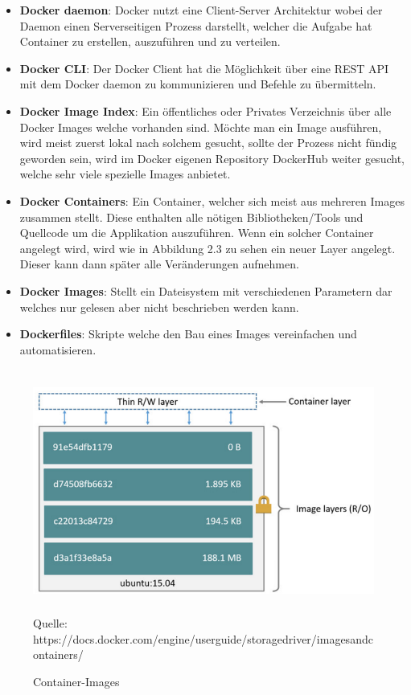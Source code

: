 \documentclass[12pt,toc=bib,toc=listof]{scrreprt}
\begin{document}
\begin{itemize}
	\item \textbf{Docker daemon}: Docker nutzt eine Client-Server Architektur wobei der Daemon einen Serverseitigen Prozess darstellt, welcher die Aufgabe hat Container zu erstellen, auszuführen und zu verteilen.
	
	\item \textbf{Docker CLI}: Der Docker Client hat die Möglichkeit über eine REST API mit dem Docker daemon zu kommunizieren und Befehle zu übermitteln.
	
	\item \textbf{Docker Image Index}: Ein öffentliches oder Privates Verzeichnis über alle Docker Images welche vorhanden sind. Möchte man ein Image ausführen, wird meist zuerst lokal nach solchem gesucht, sollte der Prozess nicht fündig geworden sein, wird im Docker eigenen Repository DockerHub weiter gesucht, welche sehr viele spezielle Images anbietet.\\
	
	\item \textbf{Docker Containers}: Ein Container, welcher sich meist aus mehreren Images zusammen stellt. Diese enthalten alle nötigen Bibliotheken/Tools und Quellcode um die Applikation auszuführen.
	Wenn ein solcher Container angelegt wird, wird wie in Abbildung 2.3 zu sehen ein neuer Layer angelegt. Dieser kann dann später alle Veränderungen aufnehmen.
	
	\item \textbf{Docker Images}: Stellt ein Dateisystem mit verschiedenen Parametern dar welches nur gelesen aber nicht beschrieben werden kann.
	
	\item \textbf{Dockerfiles}: Skripte welche den Bau eines Images vereinfachen und automatisieren.
\end{itemize}

\begin{figure}
	\centering
	\caption{Container-Images}
	\includegraphics[width=15cm, height=8cm, scale=0.3]{container-images.png}
	Quelle: https://docs.docker.com/engine/userguide/storagedriver/imagesandcontainers/
\end{figure}
\end{document}
